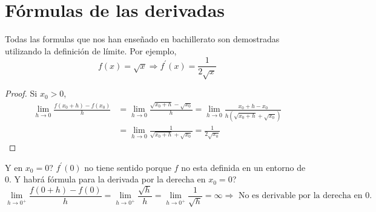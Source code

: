 \section{Fórmulas de las derivadas}
Todas las formulas que nos han enseñado en bachillerato son demostradas utilizando la definición de límite. Por ejemplo,
\[
	f(x) = \sqrt{x} \Rightarrow f^\prime (x) = \frac{1}{2 \sqrt{x } }
\]
\begin{proof}
	Si \(x_0 > 0 \),
	\begin{align*}
		\lim\limits_{h  \to 0} \frac{f(x_0 + h) - f(x_0) }{h} & = \lim\limits_{h  \to 0 } \frac{\sqrt{x_0 + h} - \sqrt{x_0}  }{h} = \lim\limits_{h  \to 0 } \frac{x_0 + h - x_0}{h (\sqrt{x_0 + h} + \sqrt{x_0}  )} \\ & = \lim\limits_{h  \to 0 } \frac{1 }{\sqrt{x_0 + h } + \sqrt{x_0 } } = \frac{1}{2 \sqrt{x_0 } }
	\end{align*}
\end{proof}

Y en \(x_0 = 0\)? \(f^\prime (0 )\) no tiene sentido porque \(f \) no esta definida en un entorno de \(0 \). Y habrá fórmula para la derivada por la derecha en \(x_0 = 0 \)?
\[
	\lim\limits_{h  \to 0^{+} } \frac{f(0 + h ) - f(0)}{h} = \lim\limits_{h  \to 0^{+} } \frac{\sqrt{h } }{h } = \lim\limits_{h  \to 0^{+ } } \frac{1}{\sqrt{h} } = \infty \Rightarrow \text{ No es derivable por la derecha en }0.
\]

